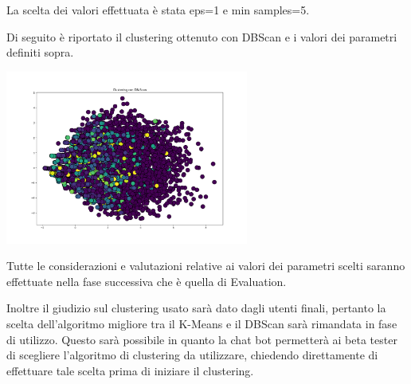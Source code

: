 \documentclass[a4paper, 10pt]{report}
\begin{document}
            La scelta dei valori effettuata è stata eps=1 e min samples=5.

            Di seguito è riportato il clustering ottenuto con DBScan e i valori dei parametri definiti sopra.

            \begin{center}
                \includegraphics[width=8cm]{modelling/DBScan.png}\\
            \end{center}

        Tutte le considerazioni e valutazioni relative ai valori dei parametri scelti saranno effettuate nella fase successiva
        che è quella di Evaluation.

        Inoltre il giudizio sul clustering usato sarà dato dagli utenti finali, pertanto la scelta dell'algoritmo migliore tra
        il K-Means e il DBScan sarà rimandata in fase di utilizzo.
        Questo sarà possibile in quanto la chat bot permetterà ai beta tester di scegliere l'algoritmo di clustering
        da utilizzare, chiedendo direttamente di effettuare tale scelta prima di iniziare il clustering.
\end{document}
